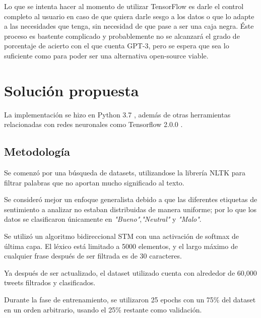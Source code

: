 \documentclass[a4]{sciposter}
\begin{document}
\begin{multicols}{2}
Lo que se intenta hacer al momento de utilizar TensorFlow es darle el control completo al usuario en caso de que quiera darle sesgo a los datos o que lo adapte a las necesidades que tenga, sin necesidad de que pase a ser una caja negra. Éste proceso es bastente complicado y probablemente no se alcanzará el grado de porcentaje de acierto con el que cuenta GPT-3, pero se espera que sea lo suficiente como para poder ser una alternativa open-source viable.

\section{Solución propuesta}
La implementación se hizo en Python 3.7 \citep{python}, además de otras herramientas relacionadas con redes neuronales como Tensorflow 2.0.0 \citep{tensorflow}.


\subsection{Metodología}
Se comenzó por una búsqueda de datasets, utilizandose la librería NLTK \citep{nltk} para filtrar palabras que no aportan mucho significado al texto.

Se consideró mejor un enfoque generalista debido a que las diferentes etiquetas de sentimiento a analizar no estaban distribuidas de manera uniforme; por lo que los datos se clasificaron únicamente en \textit{"Bueno"},\textit{"Neutral"} y \textit{"Malo"}.

Se utilizó un algoritmo bidireccional STM con una activación de softmax de última capa. El léxico está limitado a 5000 elementos, y el largo máximo de cualquier frase después de ser filtrada es de 30 caracteres.

Ya después de ser actualizado, el dataset utilizado cuenta con alrededor de 60,000 tweets filtrados y clasificados.

Durante la fase de entrenamiento, se utilizaron 25 epochs con un 75\% del dataset en un orden arbitrario, usando el 25\% restante como validación.


\end{multicols}
\end{document}
